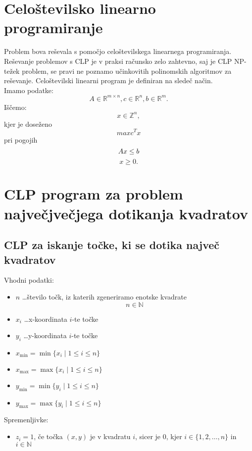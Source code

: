 \documentclass[a4paper]{article}
\begin{document}
\newpage{}

\section{Celoštevilsko linearno programiranje}

Problem bova reševala s pomočjo celoštevilskega linearnega programiranja. Reševanje problemov s CLP je v praksi računsko zelo zahtevno, saj je CLP NP-težek problem, se pravi ne poznamo učinkovitih polinomskih algoritmov za reševanje. Celoštevilski linearni program je definiran na sledeč način. \\
Imamo podatke:
$$A \in \mathbb{R}^{m \times n}, c \in  \mathbb{R}^{n}, b \in  \mathbb{R}^{m }. $$ Iščemo: $$x \in  \mathbb{Z}^{n},$$kjer je doseženo$$maxc^Tx$$
pri pogojih $$Ax\le b\\$$ $$x \ge 0.$$

\section{CLP program za problem največjvečjega dotikanja kvadratov}

\subsection{CLP za iskanje točke, ki se dotika največ kvadratov}

Vhodni podatki:

\begin{itemize}
\item{$n$ \dots število točk, iz katerih zgeneriramo enotske kvadrate} $$n \in \mathbb{N}$$
\item{$x_{i}$ \dots x-koordinata $i$-te točke}
\item{$y_{i}$ \dots y-koordinata $i$-te točke}
\item{$x_{\min} = \min \{x_i \mid 1 \le i \le n\}$}
\item{$x_{\max} = \max \{x_i \mid 1 \le i \le n\}$}
\item{$y_{\min} = \min \{y_i \mid 1 \le i \le n\}$}
\item{$y_{\max} = \max \{y_i \mid 1 \le i \le n\}$}
\end{itemize}

Spremenljivke:

\begin{itemize}
\item{$z_{i}= 1$, če točka $(x,y)$ je v kvadratu $i$}, sicer je $0$, kjer $i \in \{1, 2, \dots, n\}$ in $i \in \mathbb{N}$
\end{itemize}
\end{document}
